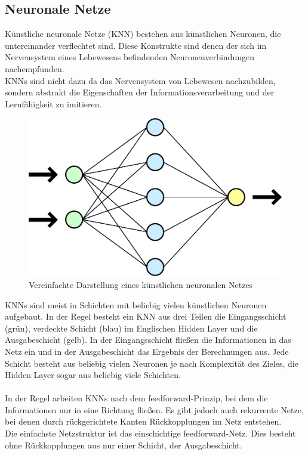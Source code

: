 \documentclass[12pt,oneside,a4paper,parskip]{scrbook}
\begin{document}
\subsection{Neuronale Netze}
Künstliche neuronale Netze (KNN) bestehen aus künstlichen Neuronen, die untereinander verflechtet sind. Diese Konstrukte sind denen der sich im Nervensystem eines Lebewesens befindenden Neuronenverbindungen nachempfunden. \\
KNNs sind nicht dazu da das Nervensystem von Lebewesen nachzubilden, sondern abstrakt die Eigenschaften der Informationsverarbeitung und der Lernfähigkeit zu imitieren.
\begin{figure}[h]
	\begin{center}
		\includegraphics[width=12cm]{Bilder/Neurales_Netz.png}
		\caption{Vereinfachte Darstellung eines künstlichen neuronalen Netzes}
		\label{fig:wikiNeuronalesNetz}
	\end{center}
\end{figure}
KNNs sind meist in Schichten mit beliebig vielen künstlichen Neuronen aufgebaut. In der Regel besteht ein KNN aus drei Teilen die Eingangsschicht (grün), verdeckte Schicht (blau) im Englischen Hidden Layer und die Ausgabeschicht (gelb). In der Eingangsschicht fließen die Informationen in das Netz ein und in der Ausgabeschicht das Ergebnis der Berechnungen aus. Jede Schicht besteht aus beliebig vielen Neuronen je nach Komplexität des Zieles, die Hidden Layer sogar aus beliebig viele Schichten.
\\\\
In der Regel arbeiten KNNs nach dem feedforward-Prinzip, bei dem die Informationen nur in eine Richtung fließen. Es gibt jedoch auch rekurrente Netze, bei denen durch rückgerichtete Kanten Rückkopplungen im Netz entstehen. \\
Die einfachste Netzstruktur ist das einschichtige feedforward-Netz. Dies besteht ohne Rückkopplungen aus nur einer Schicht, der Ausgabeschicht.
\end{document}
